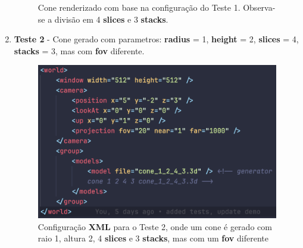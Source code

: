 \documentclass[12pt,a4paper]{report}%
\begin{document}
\begin{enumerate}
\begin{figure}[H]
\begin{minipage}{0.49\linewidth}
        \caption[Teste 1 - Desenho]{Cone renderizado com base na configuração do Teste 1. Observa-se a divisão em 4 \textbf{slices} e 3 \textbf{stacks}.}
        \label{fig:cena-teste1}
    \end{minipage}
\end{figure}
\newpage
    \item \textbf{Teste 2} - Cone gerado com parametros: \textbf{radius} = 1, \textbf{height} = 2, \textbf{slices} = 4, \textbf{stacks} = 3, mas com \textbf{fov} diferente.  
    \begin{figure}[H]
    \centering
    \begin{minipage}{0.49\linewidth}
        \centering
        \includegraphics[width=\linewidth]{images/xmlTeste2.png}
        \caption[Teste 2 - XML]{Configuração \textbf{XML} para o Teste 2, onde um cone é gerado com raio 1, altura 2, 4 \textbf{slices} e 3 \textbf{stacks}, mas com um \textbf{fov} diferente}
        \label{fig:xml-teste2}
    \end{minipage}
    \hfill
    \begin{minipage}{0.49\linewidth}
        \centering

\end{minipage}
\end{figure}
\end{enumerate}
\end{document}
